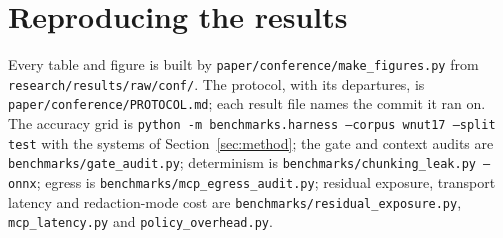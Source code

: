 \section{Reproducing the results}\label{app:repro}
Every table and figure is built by \texttt{paper/conference/make\_figures.py} from \texttt{research/results/raw/conf/}. The protocol, with its departures, is \texttt{paper/conference/PROTOCOL.md}; each result file names the commit it ran on. The accuracy grid is \texttt{python -m benchmarks.harness --corpus wnut17 --split test} with the systems of Section~\ref{sec:method}; the gate and context audits are \texttt{benchmarks/gate\_audit.py}; determinism is \texttt{benchmarks/chunking\_leak.py --onnx}; egress is \texttt{benchmarks/mcp\_egress\_audit.py}; residual exposure, transport latency and redaction-mode cost are \texttt{benchmarks/residual\_exposure.py}, \texttt{mcp\_latency.py} and \texttt{policy\_overhead.py}.
